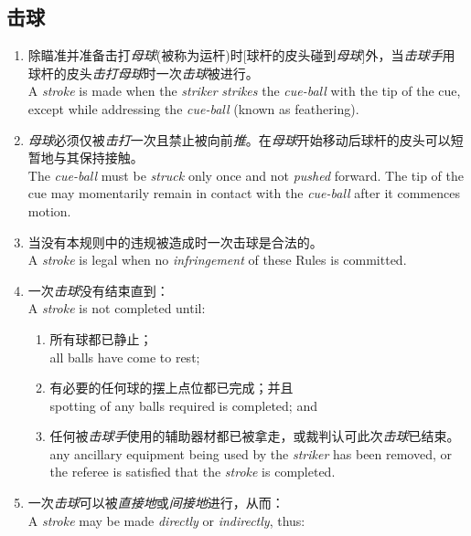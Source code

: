 \subsection{击球}

\begin{enumerate}[label=(\alph*)]
    \item 除瞄准并准备击打\textit{母球}(被称为运杆)时[球杆的皮头碰到\textit{母球}]外，当\textit{击球手}用球杆的皮头\textit{击打}\textit{母球}时一次\textit{击球}被进行。\\
    A \textit{stroke} is made when the \textit{striker} \textit{strikes} the \textit{cue-ball} with the tip of the cue, except while addressing the \textit{cue-ball} (known as feathering).
    \item \textit{母球}必须仅被\textit{击打}一次且禁止被向前\textit{推}。在\textit{母球}开始移动后球杆的皮头可以短暂地与其保持接触。\\
    The \textit{cue-ball} must be \textit{struck} only once and not \textit{pushed} forward. The tip of the cue may momentarily remain in contact with the \textit{cue-ball} after it commences motion.
    \item 当没有本规则中的违规被造成时一次击球是合法的。\\
    A \textit{stroke} is legal when no \textit{infringement} of these Rules is committed.
    \item 一次\textit{击球}没有结束直到：\\
    A \textit{stroke} is not completed until:
    \begin{enumerate}[label=(\roman*)]
        \item 所有球都已静止；\\
        all balls have come to rest;
        \item 有必要的任何球的摆上点位都已完成；并且\\
        spotting of any balls required is completed; and
        \item 任何被\textit{击球手}使用的辅助器材都已被拿走，或裁判认可此次\textit{击球}已结束。\\
        any ancillary equipment being used by the \textit{striker} has been removed, or the referee is satisfied that the \textit{stroke} is completed.
    \end{enumerate}
    \item 一次\textit{击球}可以被\textit{直接地}或\textit{间接地}进行，从而：\\
    A \textit{stroke} may be made \textit{directly} or \textit{indirectly}, thus:

\end{enumerate}
